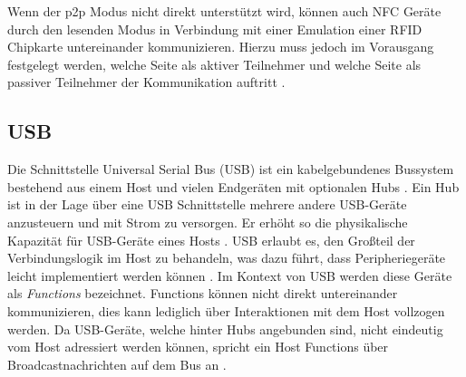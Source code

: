	Wenn der p2p Modus nicht direkt unterstützt wird, können auch NFC Geräte durch den lesenden Modus in Verbindung mit einer Emulation einer RFID Chipkarte untereinander kommunizieren. Hierzu muss jedoch im Vorausgang festgelegt werden, welche Seite als aktiver Teilnehmer und welche Seite als passiver Teilnehmer der Kommunikation auftritt \cite[S.101]{Langer}.
	
	\subsection{USB}
	Die Schnittstelle Universal Serial Bus (USB) ist ein kabelgebundenes Bussystem bestehend aus einem Host und vielen Endgeräten mit optionalen Hubs \linebreak \cite[S.23f]{Kelm}. Ein Hub ist in der Lage über eine USB Schnittstelle mehrere andere USB-Geräte anzusteuern und mit Strom zu versorgen. Er erhöht so die physikalische Kapazität für USB-Geräte eines Hosts \cite[S.40]{Kelm}. USB erlaubt es, den Großteil der Verbindungslogik im Host zu behandeln, was dazu führt, dass Peripheriegeräte leicht implementiert werden können \cite[S.37]{axelson}. Im Kontext von USB werden diese Geräte als {\it Functions} bezeichnet. Functions können nicht direkt untereinander kommunizieren, dies kann lediglich über Interaktionen mit dem Host vollzogen werden. Da USB-Geräte, welche hinter Hubs angebunden sind, nicht eindeutig vom Host adressiert werden können, spricht ein Host Functions über Broadcastnachrichten auf dem Bus an \cite[S.41]{Kelm}.
	
